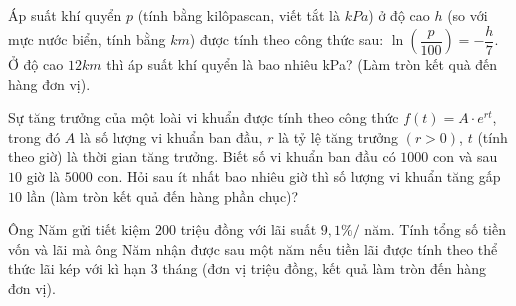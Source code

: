 \begin{ex}%
	Áp suất khí quyển $p$ (tính bằng kilôpascan, viết tắt là $kPa$) ở độ cao $h$ (so với mực nước biển, tính bằng $km$) được  tính theo công thức sau: $\ln\left(\dfrac{p}{100}\right)=-\dfrac{h}{7}$. Ở độ cao $12km$ thì áp suất khí quyển là bao nhiêu kPa? (Làm tròn kết quà đến hàng đơn vị).
\end{ex}

\begin{ex}%
	Sự tăng trưởng của một loài vi khuẩn  được tính theo công thức $f(t)=A\cdot e^{rt}$, trong đó $A$ là số lượng vi khuẩn ban đầu, $r$ là tỷ lệ tăng trưởng $(r>0)$, $t$ (tính theo giờ) là thời gian tăng trưởng. Biết số vi khuẩn ban đầu có $1000$ con và sau $10$ giờ là $5000$ con. Hỏi sau ít nhất bao nhiêu giờ thì số lượng vi khuẩn tăng gấp $10$ lần (làm tròn kết quả đến hàng phần chục)?
\end{ex}

\begin{ex}%
	Ông Năm gửi tiết kiệm $200$ triệu đồng với lãi suất $9{,}1\% /$ năm. Tính tổng số tiền vốn và lãi mà ông Năm nhận được sau một năm nếu tiền lãi được tính theo thể thức lãi kép với kì  hạn $3$ tháng (đơn vị triệu đồng, kết quả làm tròn đến hàng đơn vị).
\end{ex}

